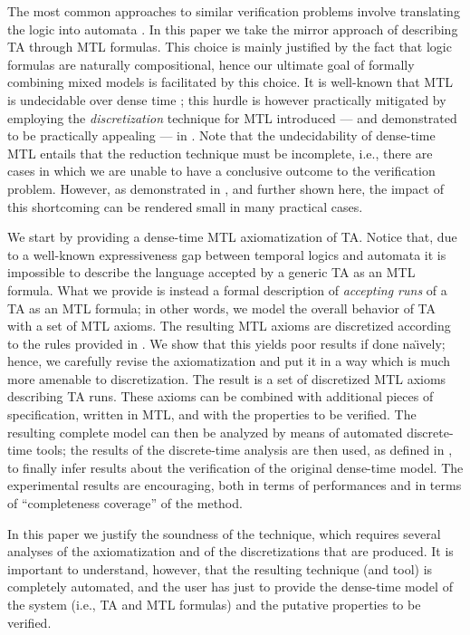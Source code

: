 \documentclass[a4paper]{article}
\theoremstyle{plain}
\theoremstyle{definition}
\begin{document}
The most common approaches to similar verification problems involve translating the logic into automata \cite{AFH96}.
In this paper we take the mirror approach of describing TA through MTL formulas.
This choice is mainly justified by the fact that logic formulas are naturally compositional, hence our ultimate goal of formally combining mixed models is facilitated by this choice.
It is well-known that MTL is undecidable over dense time \cite{AH93}; this hurdle is however practically mitigated by employing the \emph{discretization} technique for MTL introduced --- and demonstrated to be practically appealing --- in \cite{FPR08-FM08}.
Note that the undecidability of dense-time MTL entails that the reduction technique must be incomplete, i.e., there are cases in which we are unable to have a conclusive outcome to the verification problem.
However, as demonstrated in \cite{FPR08-FM08}, and further shown here, the impact of this shortcoming can be rendered small in many practical cases.

We start by providing a dense-time MTL axiomatization of TA.
Notice that, due to a well-known expressiveness gap between temporal logics and automata \cite{HRS98} it is impossible to describe the language accepted by a generic TA as an MTL formula.
What we provide is instead a formal description of \emph{accepting runs} of a TA as an MTL formula; in other words, we model the overall behavior of TA with a set of MTL axioms.
The resulting MTL axioms are discretized according to the rules provided in \cite{FPR08-FM08}.
We show that this yields poor results if done na{\"\i}vely; hence, we carefully revise the axiomatization and put it in a way which is much more amenable to discretization.
The result is a set of discretized MTL axioms describing TA runs.
These axioms can be combined with additional pieces of specification, written in MTL, and with the properties to be verified.
The resulting complete model can then be analyzed by means of automated discrete-time tools; the results of the discrete-time analysis are then used, as defined in \cite{FPR08-FM08}, to finally infer results about the verification of the original dense-time model.
The experimental results are encouraging, both in terms of performances and in terms of ``completeness coverage'' of the method.

In this paper we justify the soundness of the technique, which requires several analyses of the axiomatization and of the discretizations that are produced.
It is important to understand, however, that the resulting technique (and tool) is completely automated, and the user has just to provide the dense-time model of the system (i.e., TA and MTL formulas) and the putative properties to be verified.
\end{document}
